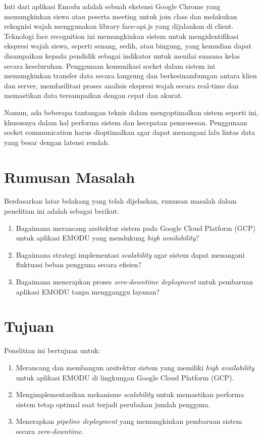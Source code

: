 Inti dari aplikasi Emodu adalah sebuah ekstensi Google Chrome yang memungkinkan siswa atau peserta meeting untuk join class dan melakukan rekognisi wajah menggunakan library face-api.js yang dijalankan di client.
Teknologi face recognition ini memungkinkan sistem untuk mengidentifikasi ekspresi wajah siswa, seperti senang, sedih, atau bingung, yang kemudian dapat disampaikan kepada pendidik sebagai indikator untuk menilai suasana kelas secara keseluruhan.
Penggunaan komunikasi socket dalam sistem ini memungkinkan transfer data secara langsung dan berkesinambungan antara klien dan server, memfasilitasi proses analisis ekspresi wajah secara real-time dan memastikan data tersampaikan dengan cepat dan akurat.

Namun, ada beberapa tantangan teknis dalam mengoptimalkan sistem seperti ini, khususnya dalam hal performa sistem dan kecepatan pemrosesan.
Penggunaan socket communication harus dioptimalkan agar dapat menangani lalu lintas data yang besar dengan latensi rendah.

\section{Rumusan Masalah}
{Berdasarkan latar belakang yang telah dijelaskan, rumusan masalah dalam penelitian ini adalah sebagai berikut:}

\begin{enumerate}
  \item
    {Bagaimana merancang arsitektur sistem pada Google Cloud Platform (GCP) untuk aplikasi EMODU yang mendukung \textit{high availability}?}
  \item
    {Bagaimana strategi implementasi \textit{scalability} agar sistem dapat menangani fluktuasi beban pengguna secara efisien?}
  \item
    {Bagaimana menerapkan proses \textit{zero-downtime deployment} untuk pembaruan aplikasi EMODU tanpa mengganggu layanan?}
\end{enumerate}

\section{Tujuan}
{Penelitian ini bertujuan untuk:}

\begin{enumerate}
  \item
    {Merancang dan membangun arsitektur sistem yang memiliki \textit{high availability} untuk aplikasi EMODU di lingkungan Google Cloud Platform (GCP).}
  \item
    {Mengimplementasikan mekanisme \textit{scalability} untuk memastikan performa sistem tetap optimal saat terjadi perubahan jumlah pengguna.}
  \item
    {Menerapkan \textit{pipeline deployment} yang memungkinkan pembaruan sistem secara \textit{zero-downtime}.}
\end{enumerate}

